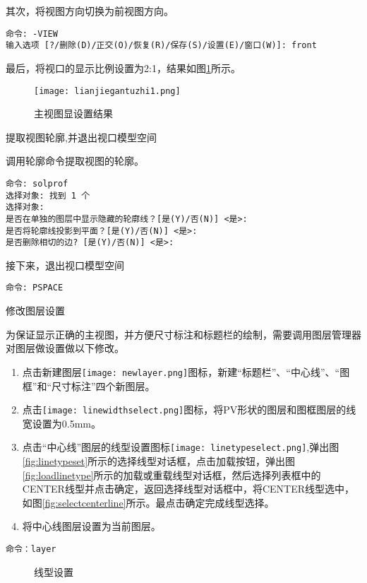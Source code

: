 \begin{procedure}
其次，将视图方向切换为前视图方向。
\begin{lstlisting}
命令: -VIEW
输入选项 [?/删除(D)/正交(O)/恢复(R)/保存(S)/设置(E)/窗口(W)]: front
\end{lstlisting}
最后，将视口的显示比例设置为2:1，结果如图\ref{fig:lianjiegantuzhi1}所示。
\begin{figure}[htbp]
\centering
\texttt{[image: lianjiegantuzhi1.png]}
\caption{主视图显设置结果}\label{fig:lianjiegantuzhi1}
\end{figure}
\item 提取视图轮廓,并退出视口模型空间

调用轮廓命令提取视图的轮廓。
\begin{lstlisting}
命令: solprof
选择对象: 找到 1 个
选择对象:
是否在单独的图层中显示隐藏的轮廓线？[是(Y)/否(N)] <是>:
是否将轮廓线投影到平面？[是(Y)/否(N)] <是>:
是否删除相切的边? [是(Y)/否(N)] <是>:
\end{lstlisting}
接下来，退出视口模型空间
\begin{lstlisting}
命令: PSPACE
\end{lstlisting}
\item 修改图层设置

为保证显示正确的主视图，并方便尺寸标注和标题栏的绘制，需要调用图层管理器对图层做设置做以下修改。

\begin{enumerate}
\item 点击新建图层\texttt{[image: newlayer.png]}图标，新建“标题栏”、“中心线”、“图框”和“尺寸标注”四个新图层。
\item 点击\texttt{[image: linewidthselect.png]}图标，将PV形状的图层和图框图层的线宽设置为0.5mm。
\item 点击“中心线”图层的线型设置图标\texttt{[image: linetypeselect.png]},弹出图\ref{fig:linetypeset}所示的选择线型对话框，点击加载按钮，弹出图\ref{fig:loadlinetype}所示的加载或重载线型对话框，然后选择列表框中的CENTER线型并点击确定，返回选择线型对话框中，将CENTER线型选中，如图\ref{fig:selectcenterline}所示。最点击确定完成线型选择。
\item 将中心线图层设置为当前图层。
\end{enumerate}
\begin{lstlisting}
命令：layer
\end{lstlisting}
\begin{figure}[htbp]
\centering
{}\hspace{20pt}
\hspace{20pt}
\caption{线型设置}
\end{figure}


\end{procedure}
